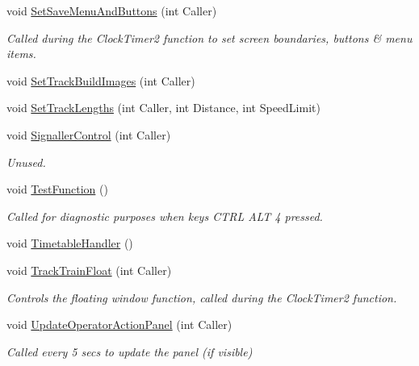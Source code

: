 \begin{DoxyCompactItemize}
void \mbox{\hyperlink{class_t_interface_afeb3a4236e5cfa7e93d7d5167304f937}{Set\+Save\+Menu\+And\+Buttons}} (int Caller)
\begin{DoxyCompactList}\small\item\em Called during the Clock\+Timer2 function to set screen boundaries, buttons \& menu items. \end{DoxyCompactList}\item 
void \mbox{\hyperlink{class_t_interface_a5c1caa770e377ec064458f42f6301ecd}{Set\+Track\+Build\+Images}} (int Caller)
\item 
void \mbox{\hyperlink{class_t_interface_acc36eb15dae8d564e6d91f8c6596065c}{Set\+Track\+Lengths}} (int Caller, int Distance, int Speed\+Limit)
\item 
\mbox{\label{class_t_interface_a060bde8a69c30d3049d1f97e6b5dfe2f}} 
void \mbox{\hyperlink{class_t_interface_a060bde8a69c30d3049d1f97e6b5dfe2f}{Signaller\+Control}} (int Caller)
\begin{DoxyCompactList}\small\item\em Unused. \end{DoxyCompactList}\item 
\mbox{\label{class_t_interface_a8d70d503d6aa655aea00771143cb5912}} 
void \mbox{\hyperlink{class_t_interface_a8d70d503d6aa655aea00771143cb5912}{Test\+Function}} ()
\begin{DoxyCompactList}\small\item\em Called for diagnostic purposes when keys C\+T\+RL A\+LT 4 pressed. \end{DoxyCompactList}\item 
void \mbox{\hyperlink{class_t_interface_a4502fb89b8be8afeaf2771fbe5d0cd75}{Timetable\+Handler}} ()
\item 
\mbox{\label{class_t_interface_a9aaa19d39382a32701d7ded3b8c1802b}} 
void \mbox{\hyperlink{class_t_interface_a9aaa19d39382a32701d7ded3b8c1802b}{Track\+Train\+Float}} (int Caller)
\begin{DoxyCompactList}\small\item\em Controls the floating window function, called during the Clock\+Timer2 function. \end{DoxyCompactList}\item 
\mbox{\label{class_t_interface_a656aa01e4fac67c4d7dede71e42208af}} 
void \mbox{\hyperlink{class_t_interface_a656aa01e4fac67c4d7dede71e42208af}{Update\+Operator\+Action\+Panel}} (int Caller)
\begin{DoxyCompactList}\small\item\em Called every 5 secs to update the panel (if visible) \end{DoxyCompactList}\end{DoxyCompactItemize}

